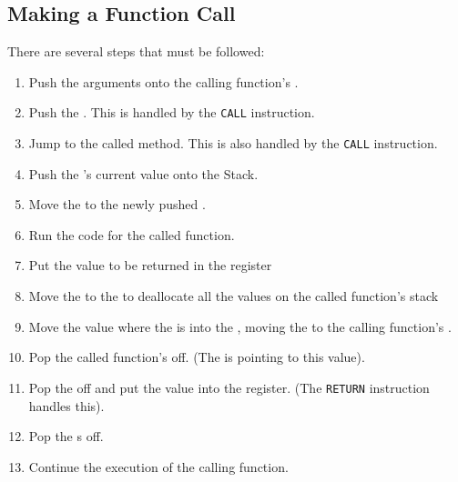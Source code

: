 \subsection{Making a Function Call}\label{subsec:Making_Function_Call}
There are several steps that must be followed:
\begin{enumerate}[noitemsep]
\item Push the arguments onto the calling function's .
\item Push the . This is handled by the \texttt{CALL} instruction.
\item Jump to the called method. This is also handled by the \texttt{CALL} instruction.
\item Push the 's current value onto the Stack.
\item Move the  to the newly pushed .
\item Run the code for the called function.
\item Put the value to be returned in the \rax{} register
\item Move the  to the  to deallocate all the values on the called function's stack
\item Move the value where the  is into the , moving the  to the calling function's .
\item Pop the called function's  off. (The  is pointing to this value).
\item Pop the  off and put the value into the \rip{} register. (The \texttt{RETURN} instruction handles this).
\item Pop the s off.
\item Continue the execution of the calling function.
\end{enumerate}

